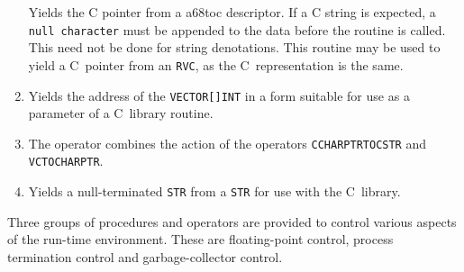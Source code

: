 \begin{enumerate}
Yields the C pointer from a a68toc descriptor. If a C string is
expected, a \verb|null character| must be appended to the data before
the routine is called. This need not be done for string denotations.
This routine may be used to yield a C~pointer from an \verb|RVC|, as
the C~representation is the same.
\item {}\newline
Yields the address of the \verb|VECTOR[]INT| in a form suitable for
use as a parameter of a C~library routine.
\item {}\newline
The operator combines the action of the operators
\texttt{CCHAR\-PTR\-TO\-CSTR} and \verb|VCTOCHARPTR|.
\item {}\newline
Yields a null-terminated \verb|STR| from a \verb|STR| for use with the
C~library.
\end{enumerate}

Three groups of procedures and operators are provided to control
various aspects of the run-time environment. These are floating-point
control, process termination control and garbage-collector control.

